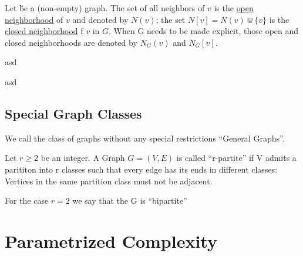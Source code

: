 \begin{definition}
    Let \G be a (non-empty) graph. 
    The set of all neighbors of $v$ is the \underline{open neighborhood} of $v$ and denoted by $N(v)$; the set $N[v] = N(v) \Cup \{v\}$ is the \underline{closed neighborhood} f $v$ in $G$. When G needs to be made explicit, those open and closed neighborhoods are denoted by $N_G(v)$ and $N_G[v]$. 
\end{definition}

\begin{definition}
    asd
\end{definition}

\begin{definition}
    asd
\end{definition}

\subsection*{Special Graph Classes}
We call the class of graphs without any special restrictions ``General Graphs''.

\begin{definition}
    Let $r \geq 2$ be an integer. A Graph $G = (V,E)$ is called ``r-partite'' if V admits a parititon into r classes such that every edge has its ends in different classes: Vertices in the same partition class must not be adjacent. 
    
    For the case $r = 2$ we say that the G is ``bipartite'' 
    
\end{definition}

\begin{definition}
    
\end{definition}

\begin{definition}
    
\end{definition}


\section{Parametrized Complexity}

